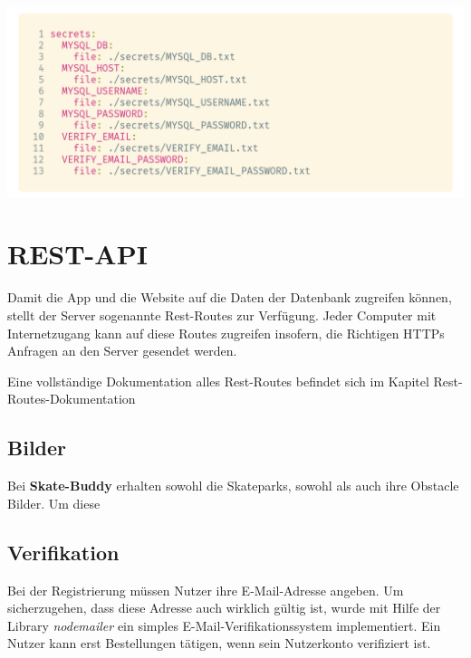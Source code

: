 \begin{code}[htp]
    \begin{center}
        \includegraphics[width=1\textwidth]{images/Backend/secrets.png}
        \vspace{-25pt}
        \caption{Sokkas Docker Secrets in der \lstinline{docker-compose.yml}}
    \end{center}
\end{code}

\section{REST-API}

Damit die App und die Website auf die Daten der Datenbank zugreifen können, stellt der Server sogenannte Rest-Routes zur Verfügung. Jeder Computer mit Internetzugang kann auf diese Routes zugreifen insofern, die Richtigen HTTPs Anfragen an den Server gesendet werden.

Eine vollständige Dokumentation alles Rest-Routes befindet sich im Kapitel Rest-Routes-Dokumentation


\subsection{Bilder}

Bei \textbf{Skate-Buddy} erhalten sowohl die Skateparks, sowohl als auch ihre Obstacle Bilder. Um diese

\subsection{Verifikation}
\label{verification}

Bei der Registrierung müssen Nutzer ihre E-Mail-Adresse angeben. Um sicherzugehen, dass diese Adresse auch wirklich gültig ist, wurde mit Hilfe der Library \textit{nodemailer} ein simples E-Mail-Verifikationssystem implementiert. Ein Nutzer kann erst Bestellungen tätigen, wenn sein Nutzerkonto verifiziert ist.

